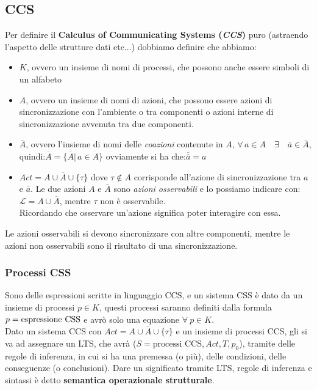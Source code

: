 \subsection{CCS}
Per definire il \textbf{Calculus of Communicating Systems (\textit{CCS})} puro (astraendo l'aspetto delle strutture dati etc$\ldots$) dobbiamo definire che abbiamo: 
\begin{itemize}
    \item $K$, ovvero un insieme di nomi di processi, che possono anche essere simboli di un alfabeto
    \item $A$, ovvero un insieme di nomi di azioni, che possono essere azioni di sincronizzazione con l’ambiente o tra componenti o azioni interne di sincronizzazione avvenuta tra due componenti.
    \item $\overline{A}$, ovvero l'insieme di nomi delle \textit{coazioni} contenute in $A$, $\forall\, a\in A \quad \exists \quad \overline{a}\in \overline{A}$, quindi:$\overline{A}=\{\overline{A}|\,a\in A\}$ ovviamente si ha che:$\overline{\overline{a}}=a$
    \item $Act=A\cup \overline{A}\cup \{\tau\}$ dove $\tau\not\in A$ corrisponde all'azione di sincronizzazione tra $a$ e $\overline{a}$. Le due azioni $A$ e $\overline{A}$ sono \textit{azioni osservabili} e lo possiamo indicare con: $\mathcal{L}=A\cup \overline{A}$, mentre $\tau$ non è osservabile.\\ Ricordando che osservare un'azione significa poter interagire con essa.
\end{itemize}
Le azioni osservabili si devono sincronizzare con altre componenti, mentre le azioni non osservabili sono il risultato di una sincronizzazione.
\subsubsection{Processi CSS}
Sono delle espressioni scritte in linguaggio CCS, e un sistema CSS è dato da un insieme di processi $p \in K$, questi processi saranno definiti dalla formula $p = \textnormal{espressione CSS}$ e avrò solo una equazione $\forall \ p \in K$. \\

Dato un sistema CCS con $Act = A \cup \overline{A} \cup \{\tau\}$ e un insieme di processi CCS, gli si va ad assegnare un LTS, che avrà ($S=\text{processi CCS}, Act, T, p_0$), tramite delle regole di inferenza, in cui si ha una premessa (o più), delle condizioni, delle conseguenze (o conclusioni). Dare un significato tramite LTS, regole di inferenza e sintassi è detto
\textbf{semantica operazionale strutturale}.

